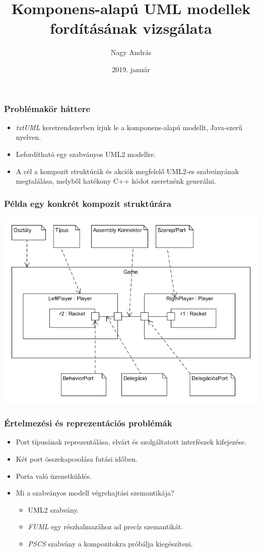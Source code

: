 \documentclass[11pt]{beamer}
\author{Nagy András}
\title{Komponens-alapú UML modellek fordításának vizsgálata}
\date{2019. január}
\begin{document}
\begin{frame}
\titlepage
\end{frame}

\begin{frame}[fragile]
	\frametitle{Problémakör háttere}
	
	\begin{itemize}
		\item \textit{txtUML} keretrendszerben írjuk le a komponens-alapú modellt, Java-szerű nyelven.
		\item Lefordítható egy szabványos UML2 modellre.
		\item A cél a kompozit struktúrák és akciók megfelelő UML2-es szabványának megtalálása, melyből hatékony C++ kódot szeretnénk generálni.
	\end{itemize}
	
\end{frame}


\begin{frame}[fragile]
	\frametitle{Példa egy konkrét kompozit struktúrára}	
	\includegraphics[scale=0.4]{vedes_demo.png}	
	
\end{frame}

\begin{frame}[fragile]	
	\frametitle{Értelmezési és reprezentációs problémák}	
	\begin{itemize}
	\item Port típusának reprezentálása, elvárt és szolgáltatott interfészek kifejezése.
	\item Két port összekapcsolása futási időben.
	\item Porta való üzenetküldés.
	\item Mi a szabványos modell végrehajtási szemantikája?
	\begin{itemize}
		\item UML2 szabvány.
		\item \textit{FUML} egy részhalmazához ad precíz szemantikát.
		\item \textit{PSCS} szabvány a kompozitokra próbálja kiegészíteni.
	\end{itemize}
	\end{itemize}
	
\end{frame}
\end{document}
